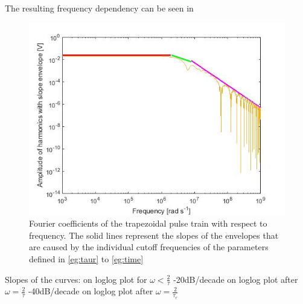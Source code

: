The resulting frequency dependency can be seen in 
\begin{figure}[h!tb]
\includegraphics[width=\textwidth]{figures/Method/signal_simulation/envelope.jpg}
\caption[Kurze Abbildungsbeschreibung]{Fourier coefficients of the trapezoidal pulse train with respect to frequency. The solid lines represent the slopes of the envelopes that are caused by the individual 
cutoff frequencies of the parameters defined in \eqref{eg:taur} to \eqref{eg:time}}
\label{fig.envelope}
\end{figure}


Slopes of the curves:  on loglog plot for $\omega < \frac{2}{\tau}$\newline
-20dB/decade on loglog plot after $\omega = \frac{2}{\tau}$ \newline
-40dB/decade on loglog plot after $\omega = \frac{2}{\tau_r}$\newline



	
